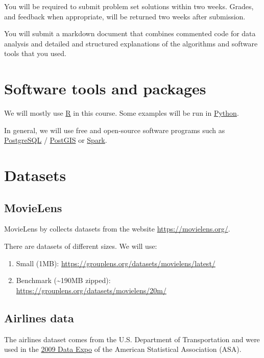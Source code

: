 \documentclass[]{book}
\providecommand{\tightlist}{%
  \setlength{\itemsep}{0pt}\setlength{\parskip}{0pt}}
\theoremstyle{definition}
\theoremstyle{definition}
\theoremstyle{definition}
\theoremstyle{remark}
\begin{document}
You will be required to submit problem set solutions within two weeks.
Grades, and feedback when appropriate, will be returned two weeks after
submission.

You will submit a markdown document that combines commented code for
data analysis and detailed and structured explanations of the algorithms
and software tools that you used.

\section{Software tools and packages}\label{software-tools-and-packages}

We will mostly use \href{https://www.r-project.org/}{R} in this course.
Some examples will be run in \href{https://www.python.org/}{Python}.

In general, we will use free and open-source software programs such as
\href{https://www.postgresql.org/}{PostgreSQL} /
\href{http://postgis.net/}{PostGIS} or
\href{https://spark.apache.org/}{Spark}.

\section{Datasets}\label{datasets}

\subsection{MovieLens}\label{movielens}

MovieLens by
\citet[\url{https://grouplens.org/datasets/movielens/}]{Harper2015}
collects datasets from the website \url{https://movielens.org/}.

There are datasets of different sizes. We will use:

\begin{enumerate}
\def\labelenumi{\arabic{enumi}.}
\tightlist
\item
  Small (1MB): \url{https://grouplens.org/datasets/movielens/latest/}
\item
  Benchmark (\textasciitilde{}190MB zipped):
  \url{https://grouplens.org/datasets/movielens/20m/}
\end{enumerate}

\subsection{Airlines data}\label{airlines-data}

The airlines dataset comes from the U.S. Department of Transportation
and were used in the
\href{http://stat-computing.org/dataexpo/2009/}{2009 Data Expo} of the
American Statistical Association (ASA).
\end{document}
